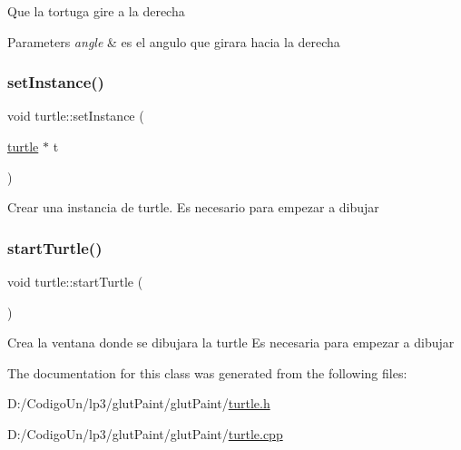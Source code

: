 Que la tortuga gire a la derecha 
\begin{DoxyParams}{Parameters}
{\em angle} & es el angulo que girara hacia la derecha \\
\hline
\end{DoxyParams}
\mbox{\label{classturtle_a1598c2ba3f8645f8312695793e4c9cbd}} 
\subsubsection{\texorpdfstring{setInstance()}{setInstance()}}
{\footnotesize\ttfamily void turtle\+::set\+Instance (\begin{DoxyParamCaption}\item[{\mbox{\hyperlink{classturtle}{turtle}} $\ast$}]{t }\end{DoxyParamCaption})\hspace{0.3cm}{\ttfamily [static]}}

Crear una instancia de turtle. Es necesario para empezar a dibujar \mbox{\label{classturtle_a143af204e99516b62c98819342d1926c}} 
\subsubsection{\texorpdfstring{startTurtle()}{startTurtle()}}
{\footnotesize\ttfamily void turtle\+::start\+Turtle (\begin{DoxyParamCaption}{ }\end{DoxyParamCaption})}

Crea la ventana donde se dibujara la turtle Es necesaria para empezar a dibujar 

The documentation for this class was generated from the following files\+:\begin{DoxyCompactItemize}
\item 
D\+:/\+Codigo\+Un/lp3/glut\+Paint/glut\+Paint/\mbox{\hyperlink{turtle_8h}{turtle.\+h}}\item 
D\+:/\+Codigo\+Un/lp3/glut\+Paint/glut\+Paint/\mbox{\hyperlink{turtle_8cpp}{turtle.\+cpp}}\end{DoxyCompactItemize}
